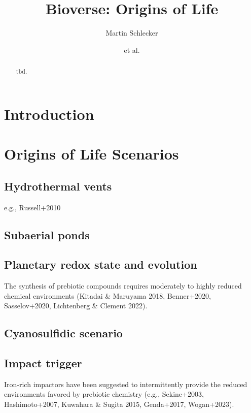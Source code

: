 \documentclass[twocolumn]{aastex631}
\begin{document}
\title{Bioverse: Origins of Life}

\author[0000-0001-8355-2107]{Martin Schlecker}
\author{et al.}

\begin{abstract}
    tbd.
\end{abstract}

\section{Introduction}
\label{sec:intro}

\section{Origins of Life Scenarios}
\label{sec:ool_scenarios}

\subsection{Hydrothermal vents}
e.g., Russell+2010

\subsection{Subaerial ponds}

\subsection{Planetary redox state and evolution}
The synthesis of prebiotic compounds requires moderately to highly reduced chemical environments (Kitadai \& Maruyama 2018, Benner+2020, Sasselov+2020, Lichtenberg \& Clement 2022).

\subsection{Cyanosulfidic scenario}

\subsection{Impact trigger}
Iron-rich impactors have been suggested to intermittently provide the reduced environments favored by prebiotic chemistry (e.g., Sekine+2003, Hashimoto+2007, Kuwahara \& Sugita 2015, Genda+2017, Wogan+2023).
\end{document}
